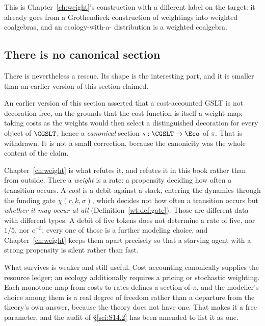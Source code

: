 This is Chapter~\ref{ch:weight}'s construction with a different label on the target: it already goes
from a Grothendieck construction of weightings into weighted coalgebras, and an ecology-with-a-
distribution is a weighted coalgebra.

\subsection{There is no canonical section}\label{sci:S15.2}

There is nevertheless a rescue. Its shape is the interesting part, and it is smaller than an earlier
version of this section claimed.

\begin{remark}
\label{sci:prop:section}
An earlier version of this section asserted that a cost-accounted GSLT is not decoration-free, on the
grounds that the cost function is itself a weight map; taking costs as the weights would then select a
distinguished decoration for every object of $\CGSLT$, hence a \emph{canonical} section
$s : \CGSLT \to \Eco$ of $\pi$. That is withdrawn. It is not a small correction, because the
canonicity was the whole content of the claim.

Chapter~\ref{ch:weight} is what refutes it, and refutes it in this book rather than from outside.
There a \emph{weight} is a rate: a propensity deciding how often a transition occurs. A \emph{cost}
is a debit against a stack, entering the dynamics through the funding gate $\chi(r,k,\sigma)$, which
decides not how often a transition occurs but \emph{whether it may occur at all}
(Definition~\ref{wt:def:gate}). Those are different data with different types. A debit of five tokens
does not determine a rate of five, nor $1/5$, nor $e^{-5}$; every one of those is a further modeling
choice, and Chapter~\ref{ch:weight} keeps them apart precisely so that a starving agent with a strong
propensity is silent rather than fast.
\end{remark}

What survives is weaker and still useful. Cost accounting canonically supplies the resource ledger; an
ecology additionally requires a pricing or stochastic weighting. Each monotone map from costs to rates
defines a section of $\pi$, and the modeller's choice among them is a real degree of freedom rather
than a departure from the theory's own answer, because the theory does not have one. That makes it a
free parameter, and the audit of \S\ref{sci:S14.2} has been amended to list it as one.

